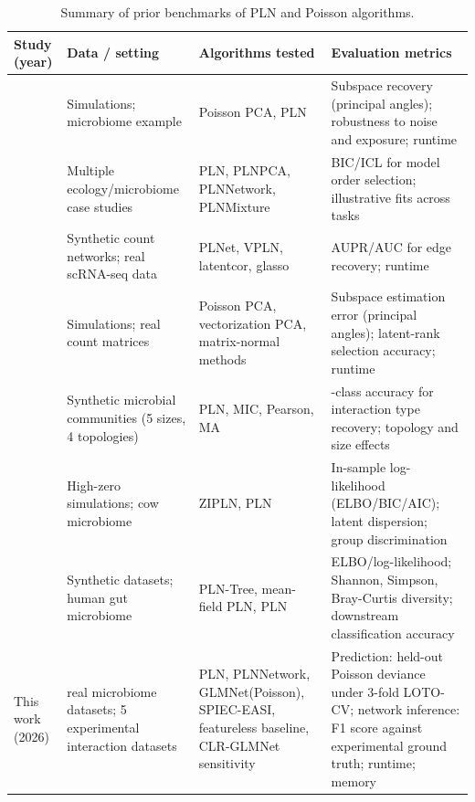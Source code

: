 \documentclass[USenglish]{article}
\theoremstyle{dgthm}
\begin{document}
\begin{table}[htbp]
\caption{Summary of prior benchmarks of PLN and Poisson algorithms.}
\centering
\scriptsize
\setlength{\tabcolsep}{2pt}
\begin{tabular}{>{\raggedright\arraybackslash}p{2.5cm}>{\raggedright\arraybackslash}p{3.2cm}>{\raggedright\arraybackslash}p{3.2cm}>{\raggedright\arraybackslash}p{4.1cm}}
\toprule
Study (year) & Data / setting & Algorithms tested & Evaluation metrics \\
\midrule
\citet{Kenney2021PoissonPCA} & Simulations; microbiome example & Poisson PCA, PLN & Subspace recovery (principal angles); robustness to noise and exposure; runtime \\
\midrule
\citet{Chiquet2021} & Multiple ecology/microbiome case studies & PLN, PLNPCA, PLNNetwork, PLNMixture & BIC/ICL for model order selection; illustrative fits across tasks \\
\midrule
\citet{Xiao2022PLNet} & Synthetic count networks; real scRNA-seq data & PLNet, VPLN, latentcor, glasso & AUPR/AUC for edge recovery; runtime \\
\midrule
\citet{Virta2023PoissonPCA} & Simulations; real count matrices & Poisson PCA, vectorization PCA, matrix-normal methods & Subspace estimation error (principal angles); latent-rank selection accuracy; runtime \\
\midrule
\citet{Qian2024} & Synthetic microbial communities (5 sizes, 4 topologies) & PLN, MIC, Pearson, MA & 3-class accuracy for interaction type recovery; topology and size effects \\
\midrule
\citet{Batardiere2025ZIPLN} & High-zero simulations; cow microbiome & ZIPLN, PLN & In-sample log-likelihood (ELBO/BIC/AIC); latent dispersion; group discrimination \\
\midrule
\citet{Chaussard2025PLNTree} & Synthetic datasets; human gut microbiome & PLN-Tree, mean-field PLN, PLN & ELBO/log-likelihood; Shannon, Simpson, Bray-Curtis diversity; downstream classification accuracy \\
\midrule
This work (2026) & 20 real microbiome datasets; 5 experimental interaction datasets & PLN, PLNNetwork, GLMNet(Poisson), SPIEC-EASI, featureless baseline, CLR-GLMNet sensitivity & Prediction: held-out Poisson deviance under 3-fold LOTO-CV; network inference: F1 score against experimental ground truth; runtime; memory \\
\bottomrule
\end{tabular}
\label{tab:related_work}
\end{table}
\end{document}

